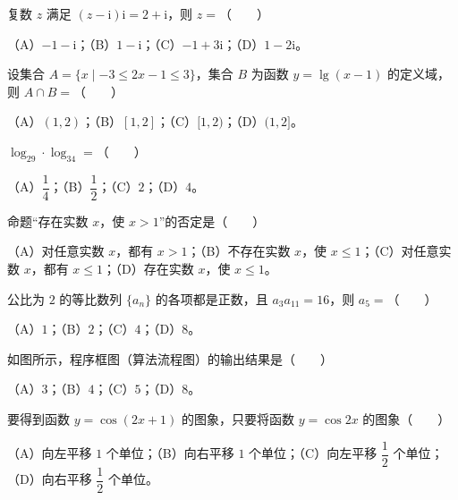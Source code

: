 

\begin{question}
复数 $z$ 满足 $(z-\mathrm i)\mathrm i=2+\mathrm i$，则 $z=$\mbox{（　　）}

（A）$-1-\mathrm i$；（B）$1-\mathrm i$；（C）$-1+3\mathrm i$；（D）$1-2\mathrm i$。

\end{question}
\begin{question}
设集合 $A=\{x\mid-3\leqslant2x-1\leqslant3\}$，集合 $B$ 为函数 $y=\lg(x-1)$ 的定义域，则 $A\cap B=$\mbox{（　　）}

（A）$(1,2)$；（B）$[1,2]$；（C）$[1,2)$；（D）$(1,2]$。

\end{question}
\begin{question}
$\log_29\cdot\log_34=$\mbox{（　　）}

（A）$\dfrac14$；（B）$\dfrac12$；（C）$2$；（D）$4$。

\end{question}
\begin{question}
命题“存在实数 $x$，使 $x>1$”的否定是\mbox{（　　）}

（A）对任意实数 $x$，都有 $x>1$；（B）不存在实数 $x$，使 $x\leqslant1$；（C）对任意实数 $x$，都有 $x\leqslant1$；（D）存在实数 $x$，使 $x\leqslant1$。

\end{question}
\begin{question}
公比为 $2$ 的等比数列 $\{a_n\}$ 的各项都是正数，且 $a_3a_{11}=16$，则 $a_5=$\mbox{（　　）}

（A）$1$；（B）$2$；（C）$4$；（D）$8$。

\Needspace{0.4\textheight}
\end{question}
\begin{question}
如图所示，程序框图（算法流程图）的输出结果是\mbox{（　　）}
\nopagebreak[4]
\begin{center}\end{center}
\nopagebreak[4]
（A）$3$；（B）$4$；（C）$5$；（D）$8$。

\end{question}
\begin{question}
要得到函数 $y=\cos(2x+1)$ 的图象，只要将函数 $y=\cos2x$ 的图象\mbox{（　　）}

（A）向左平移 $1$ 个单位；（B）向右平移 $1$ 个单位；（C）向左平移 $\dfrac12$ 个单位；（D）向右平移 $\dfrac12$ 个单位。

\end{question}
